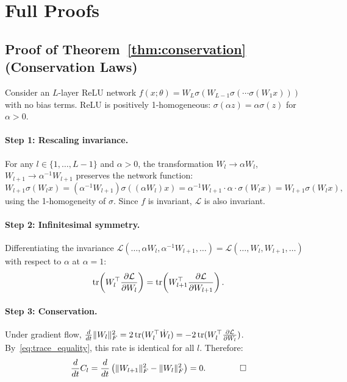 \section{Full Proofs}
\label{app:proofs}

\subsection{Proof of Theorem~\ref{thm:conservation} (Conservation Laws)}
\label{app:proof:conservation}

Consider an $L$-layer ReLU network $f(x;\theta) = W_L \sigma(W_{L-1}\sigma(\cdots\sigma(W_1 x)))$ with no bias terms. ReLU is positively 1-homogeneous: $\sigma(\alpha z) = \alpha\sigma(z)$ for $\alpha > 0$.

\paragraph{Step 1: Rescaling invariance.}
For any $l \in \{1,\ldots,L-1\}$ and $\alpha > 0$, the transformation $W_l \to \alpha W_l$, $W_{l+1} \to \alpha^{-1}W_{l+1}$ preserves the network function:
\begin{equation}
    W_{l+1}\sigma(W_l x) = (\alpha^{-1}W_{l+1})\sigma((\alpha W_l)x) = \alpha^{-1}W_{l+1}\cdot\alpha\cdot\sigma(W_l x) = W_{l+1}\sigma(W_l x),
\end{equation}
using the 1-homogeneity of $\sigma$. Since $f$ is invariant, $\mathcal{L}$ is also invariant.

\paragraph{Step 2: Infinitesimal symmetry.}
Differentiating the invariance $\mathcal{L}(\ldots,\alpha W_l, \alpha^{-1}W_{l+1},\ldots) = \mathcal{L}(\ldots,W_l,W_{l+1},\ldots)$ with respect to $\alpha$ at $\alpha=1$:
\begin{equation}\label{eq:trace_equality}
    \operatorname{tr}\!\left(W_l^\top \frac{\partial\mathcal{L}}{\partial W_l}\right) = \operatorname{tr}\!\left(W_{l+1}^\top \frac{\partial\mathcal{L}}{\partial W_{l+1}}\right).
\end{equation}

\paragraph{Step 3: Conservation.}
Under gradient flow, $\frac{d}{dt}\|W_l\|_F^2 = 2\operatorname{tr}(W_l^\top \dot{W}_l) = -2\operatorname{tr}(W_l^\top \frac{\partial\mathcal{L}}{\partial W_l})$. By~\eqref{eq:trace_equality}, this rate is identical for all $l$. Therefore:
\begin{equation}
    \frac{d}{dt}C_l = \frac{d}{dt}\left(\|W_{l+1}\|_F^2 - \|W_l\|_F^2\right) = 0. \qquad\qed
\end{equation}

